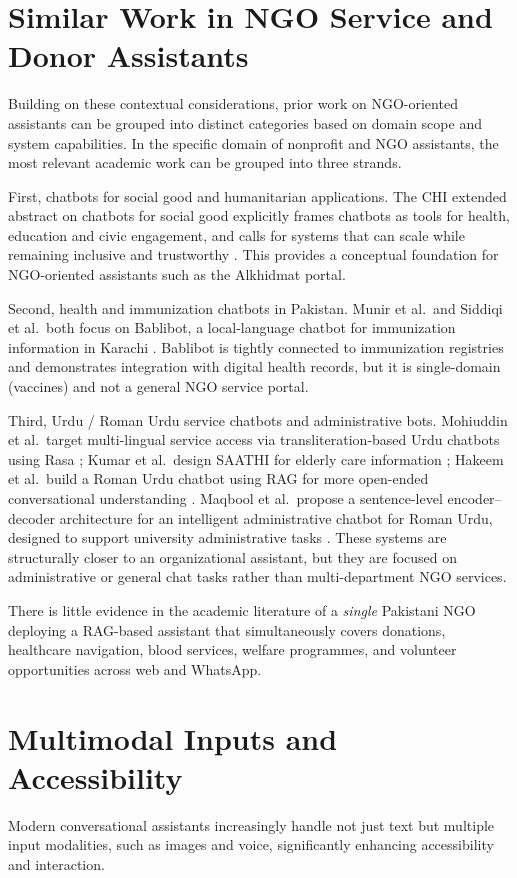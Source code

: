 \section{Similar Work in NGO Service and Donor Assistants}
Building on these contextual considerations, prior work on NGO-oriented assistants can be grouped into distinct categories based on domain scope and system capabilities. In the specific domain of nonprofit and NGO assistants, the most relevant academic work can be grouped into three strands.

First, chatbots for social good and humanitarian applications. The CHI extended abstract on chatbots for social good explicitly frames chatbots as tools for health, education and civic engagement, and calls for systems that can scale while remaining inclusive and trustworthy \cite{folstad2018socialgood}. This provides a conceptual foundation for NGO-oriented assistants such as the Alkhidmat portal.

Second, health and immunization chatbots in Pakistan. Munir et al.\ and Siddiqi et al.\ both focus on Bablibot, a local-language chatbot for immunization information in Karachi \cite{munir2021bablibot,siddiqi2024bablibot}. Bablibot is tightly connected to immunization registries and demonstrates integration with digital health records, but it is single-domain (vaccines) and not a general NGO service portal.

Third, Urdu / Roman Urdu service chatbots and administrative bots. Mohiuddin et al.\ target multi-lingual service access via transliteration-based Urdu chatbots using Rasa \cite{mohiuddin2023multilingual}; Kumar et al.\ design SAATHI for elderly care information \cite{kumar2022saathi}; Hakeem et al.\ build a Roman Urdu chatbot using RAG for more open-ended conversational understanding \cite{hakeem2025romanurdu}. Maqbool et al.\ propose a sentence-level encoder–decoder architecture for an intelligent administrative chatbot for Roman Urdu, designed to support university administrative tasks \cite{maqbool2025adminbot}. These systems are structurally closer to an organizational assistant, but they are focused on administrative or general chat tasks rather than multi-department NGO services.

There is little evidence in the academic literature of a \emph{single} Pakistani NGO deploying a RAG-based assistant that simultaneously covers donations, healthcare navigation, blood services, welfare programmes, and volunteer opportunities across web and WhatsApp.

\section{Multimodal Inputs and Accessibility} 
Modern conversational assistants increasingly handle not just text but multiple input modalities, such as images and voice, significantly enhancing accessibility and interaction.

